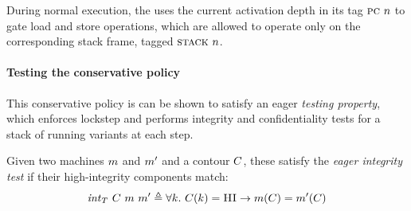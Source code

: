 \documentclass[acmsmall,review,anonymous]{acmart}\settopmatter{printfolios=true,printccs=false,printacmref=false}
\begin{document}

During normal execution, the {\PCname} uses the current activation depth in its
tag $\textsc{pc} ~ n$ to gate load and store operations, which are allowed to
operate only on the corresponding stack frame, tagged $\textsc{stack} ~ n$.



\paragraph*{Testing the conservative policy}
%
This conservative policy is can be shown to satisfy an eager \emph{testing
property}, which enforces lockstep and performs integrity and confidentiality
tests for a stack of running variants at each step.

  Given two machines  $m$ and $m'$ and a contour $C$, these
  satisfy the \emph{eager integrity test} if their high-integrity components
  match:
  \[
    \mathit{int}_T ~ C ~ m ~ m' \triangleq
    \forall k . ~
    C(k) = \textsc{HI} \rightarrow
    m(C) = m'(C)
    \]
\end{document}
